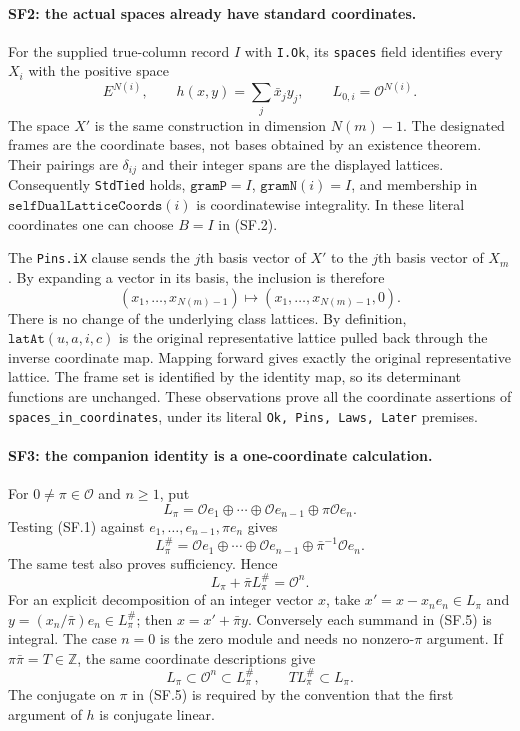 \paragraph{SF2: the actual spaces already have standard coordinates.}
For the supplied true-column record $I$ with \texttt{I.Ok}, its
\texttt{spaces} field identifies every $X_i$ with the positive space
\[
 E^{N(i)},\qquad h(x,y)=\sum_j\bar x_jy_j,
 \qquad L_{0,i}=\mathcal O^{N(i)}.
                                                               \tag{SF.3}
\]
The space $X'$ is the same construction in dimension $N(m)-1$.
The designated frames are the coordinate bases, not bases obtained by
an existence theorem. Their pairings are $\delta_{ij}$ and their
integer spans are the displayed lattices. Consequently
\texttt{StdTied} holds, $\texttt{gramP}=I$,
$\texttt{gramN}(i)=I$, and membership in
$\texttt{selfDualLatticeCoords}(i)$ is coordinatewise integrality.
In these literal coordinates one can choose $B=I$ in (SF.2).

The \texttt{Pins.iX} clause sends the $j$th basis vector of $X'$ to
the $j$th basis vector of $X_m$. By expanding a vector in its basis,
the inclusion is therefore
\[
 (x_1,\ldots,x_{N(m)-1})\longmapsto
 (x_1,\ldots,x_{N(m)-1},0).                              \tag{SF.4}
\]
There is no change of the underlying class lattices. By definition,
$\texttt{latAt}(u,a,i,c)$ is the original representative lattice pulled
back through the inverse coordinate map. Mapping forward gives exactly
the original representative lattice. The frame set is identified by the
identity map, so its determinant functions are unchanged. These observations
prove all the coordinate assertions of
\texttt{spaces\_in\_coordinates}, under its literal
\texttt{Ok, Pins, Laws, Later} premises.

\paragraph{SF3: the companion identity is a one-coordinate calculation.}
For $0\ne\pi\in\mathcal O$ and $n\ge1$, put
\[
 L_\pi=\mathcal O e_1\oplus\cdots\oplus\mathcal O e_{n-1}
                         \oplus\pi\mathcal O e_n.
\]
Testing (SF.1) against $e_1,\ldots,e_{n-1},\pi e_n$ gives
\[
 L_\pi^\#=
 \mathcal O e_1\oplus\cdots\oplus\mathcal O e_{n-1}
                         \oplus\bar\pi^{-1}\mathcal O e_n.
\]
The same test also proves sufficiency. Hence
\[
 \boxed{\ L_\pi+\bar\pi L_\pi^\#=\mathcal O^n.\ }       \tag{SF.5}
\]
For an explicit decomposition of an integer vector $x$, take
$x'=x-x_ne_n\in L_\pi$ and
$y=(x_n/\bar\pi)e_n\in L_\pi^\#$; then
$x=x'+\bar\pi y$. Conversely each summand in (SF.5) is integral.
The case $n=0$ is the zero module and needs no nonzero-$\pi$ argument.
If $\pi\bar\pi=T\in\mathbb Z$, the same coordinate descriptions give
\[
 L_\pi\subset\mathcal O^n\subset L_\pi^\#,
 \qquad T L_\pi^\#\subset L_\pi.                       \tag{SF.6}
\]
The conjugate on $\pi$ in (SF.5) is required by the convention
that the first argument of $h$ is conjugate linear.

